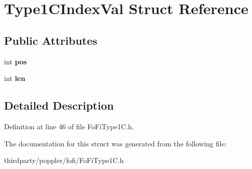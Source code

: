 \hypertarget{struct_type1_c_index_val}{}\section{Type1\+C\+Index\+Val Struct Reference}
\label{struct_type1_c_index_val}
\subsection*{Public Attributes}
\begin{DoxyCompactItemize}
\item 
\mbox{\label{struct_type1_c_index_val_aee5e54eef7627e6652084370d087739a}} 
int {\bfseries pos}
\item 
\mbox{\label{struct_type1_c_index_val_ab08d1844b318906948ef9363ff519346}} 
int {\bfseries len}
\end{DoxyCompactItemize}


\subsection{Detailed Description}


Definition at line 46 of file Fo\+Fi\+Type1\+C.\+h.



The documentation for this struct was generated from the following file\+:\begin{DoxyCompactItemize}
\item 
thirdparty/poppler/fofi/Fo\+Fi\+Type1\+C.\+h\end{DoxyCompactItemize}
